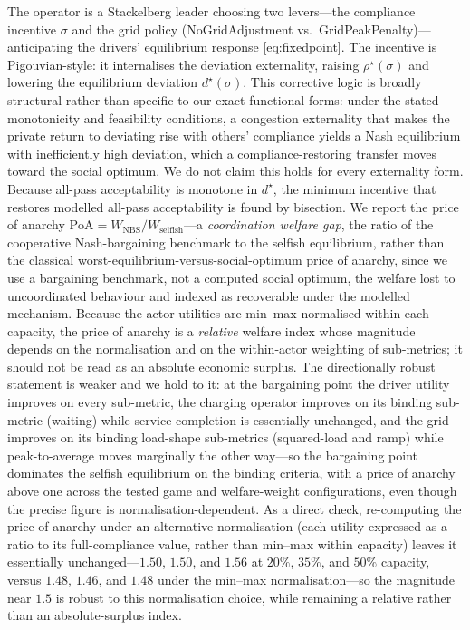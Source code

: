 \documentclass[12pt]{article}
\begin{document}
The operator is a Stackelberg leader choosing two levers---the compliance incentive
$\sigma$ and the grid policy (NoGridAdjustment vs.\ GridPeakPenalty)---anticipating the
drivers' equilibrium response \eqref{eq:fixedpoint}. The incentive is Pigouvian-style: it
internalises the deviation externality, raising $\rho^\star(\sigma)$ and lowering the
equilibrium deviation $d^\star(\sigma)$. This corrective logic is broadly structural rather than
specific to our exact functional forms: under the stated monotonicity and feasibility
conditions, a congestion externality that makes the private return to deviating rise with
others' compliance yields a Nash equilibrium with inefficiently high deviation, which a
compliance-restoring transfer moves toward the social optimum. We do not claim this holds
for every externality form. Because all-pass acceptability is monotone in $d^\star$, the
minimum incentive that restores modelled all-pass acceptability is found by bisection. We report the price
of anarchy $\mathrm{PoA}=W_{\mathrm{NBS}}/W_{\mathrm{selfish}}$---a \emph{coordination welfare gap}, the ratio of the cooperative Nash-bargaining benchmark to the selfish equilibrium, rather than the classical worst-equilibrium-versus-social-optimum price of anarchy, since we use a bargaining benchmark, not a computed social optimum, the welfare lost to
uncoordinated behaviour and indexed as recoverable under the modelled mechanism. Because the actor utilities are
min--max normalised within each capacity, the price of anarchy is a \emph{relative}
welfare index whose magnitude depends on the normalisation and on the within-actor
weighting of sub-metrics; it should not be read as an absolute economic surplus. The
directionally robust statement is weaker and we hold to it: at the bargaining point the
driver utility improves on every sub-metric, the charging operator improves on its binding sub-metric
(waiting) while service completion is essentially unchanged, and the grid improves on its
binding load-shape sub-metrics (squared-load and ramp) while peak-to-average moves
marginally the other way---so the bargaining point dominates the selfish equilibrium on
the binding criteria, with a price of anarchy above one across the tested game and
welfare-weight configurations, even though the precise figure is normalisation-dependent.
As a direct check, re-computing the price of anarchy under an alternative normalisation
(each utility expressed as a ratio to its full-compliance value, rather than min--max
within capacity) leaves it essentially unchanged---$1.50$, $1.50$, and $1.56$ at $20\%$,
$35\%$, and $50\%$ capacity, versus $1.48$, $1.46$, and $1.48$ under the min--max
normalisation---so the magnitude near $1.5$ is robust to this normalisation choice, while
remaining a relative rather than an absolute-surplus index.
\end{document}
